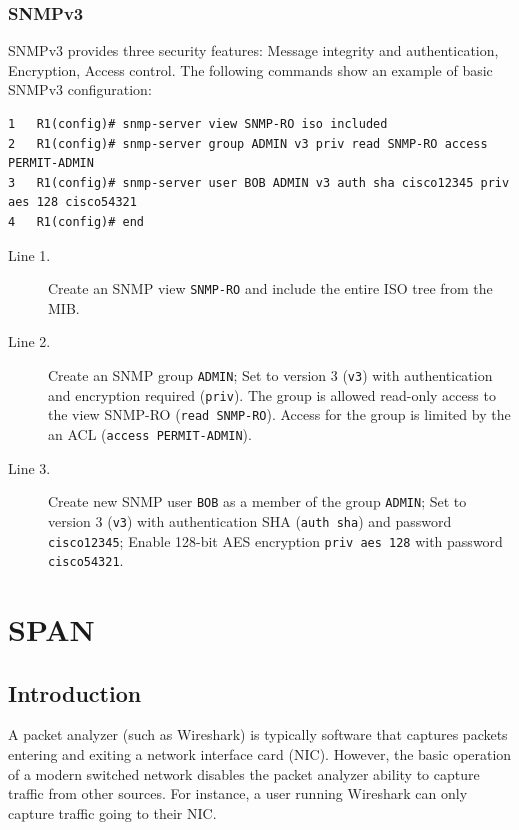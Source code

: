 \subsubsection{SNMPv3}

SNMPv3 provides three security features: Message integrity and authentication, Encryption, Access control. The following commands show an example of basic SNMPv3 configuration:

\begin{verbatim}
1	R1(config)# snmp-server view SNMP-RO iso included
2	R1(config)# snmp-server group ADMIN v3 priv read SNMP-RO access PERMIT-ADMIN
3	R1(config)# snmp-server user BOB ADMIN v3 auth sha cisco12345 priv aes 128 cisco54321
4	R1(config)# end
\end{verbatim}

\begin{description}
\item[Line 1.] Create an SNMP view \verb|SNMP-RO| and include the entire ISO tree from the MIB. 
\item[Line 2.] Create an SNMP group \verb|ADMIN|; Set to version 3 (\verb|v3|) with authentication and encryption required (\verb|priv|). The group is allowed read-only access to the view SNMP-RO (\verb|read SNMP-RO|). Access for the group is limited by the an ACL (\verb|access PERMIT-ADMIN|). 
\item[Line 3.] Create new SNMP user \verb|BOB| as a member of the group \verb|ADMIN|; Set to version 3 (\verb|v3|) with authentication SHA (\verb|auth sha|) and password \verb|cisco12345|; Enable 128-bit AES encryption \verb|priv aes 128| with password \verb|cisco54321|.
\end{description}

\section{SPAN}

\subsection{Introduction}
A packet analyzer (such as Wireshark) is typically software that captures packets entering and exiting a network interface card (NIC). However, the basic operation of a modern switched network disables the packet analyzer ability to capture traffic from other sources. For instance, a user running Wireshark can only capture traffic going to their NIC.\\

